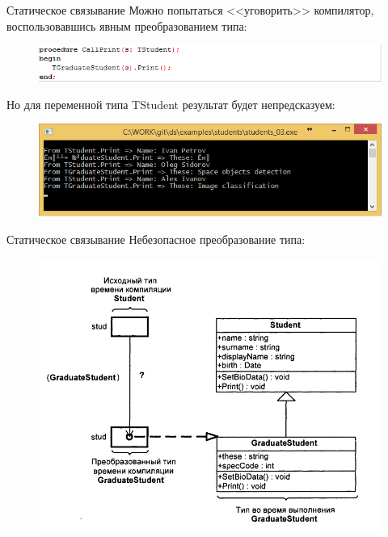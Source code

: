 \documentclass{beamer}
\begin{document}
\begin{frame}{Статическое связывание}
Можно попытаться <<уговорить>> компилятор, воспользовавшись явным преобразованием типа:
\begin{figure}[h]
\centering
\includegraphics[scale=0.4]{images/lec07-pic03.png}
\end{figure}
Но для переменной типа TStudent результат будет непредсказуем:
\begin{figure}[h]
\centering
\includegraphics[scale=0.4]{images/lec07-pic04.png}
\end{figure}
\end{frame}

\begin{frame}{Статическое связывание}
Небезопасное преобразование типа:
\begin{figure}[h]
\centering
\includegraphics[scale=0.4]{images/lec07-pic05.png}
\end{figure}
\end{frame}
\end{document}
